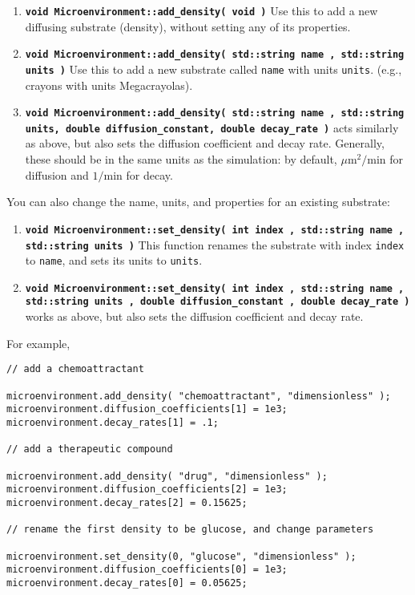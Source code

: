 \documentclass[12pt]{article}
\newcommand{\micron}{\mu\textrm{m}}
\renewcommand{\v}{\verb}
\newcommand{\smallcode}[1]{\textbf{\texttt{#1}}}
\begin{document}
\begin{enumerate}
\item 
\smallcode{void Microenvironment::add\_density( void )} Use this to add a new diffusing 
substrate (density), without setting any of its properties. 

\item 
\smallcode{void Microenvironment::add\_density( std::string name , std::string units )} Use this 
to add a new substrate called \v|name| with units \v|units|. (e.g., crayons with units Megacrayolas). 

\item 
\smallcode{void Microenvironment::add\_density( std::string name , std::string units, double diffusion\_constant, double decay\_rate )} acts similarly as above, but also sets the diffusion coefficient and decay rate. Generally, 
these should be in the same units as the simulation: by default, $\micron^2/\textrm{min}$ for diffusion 
and $1/\textrm{min}$ for decay. 
\end{enumerate}

You can also change the name, units, and properties for an existing substrate: 
\begin{enumerate}
\item 
\smallcode{void Microenvironment::set\_density( int index , std::string name , std::string units )} This 
function renames the substrate with index \v|index| to \v|name|, and sets its units to \v|units|. 

\item 
\smallcode{void Microenvironment::set\_density( int index , std::string name , std::string units , 
double diffusion\_constant , double decay\_rate )} works as above, but 
also sets the diffusion coefficient and decay rate. 
\end{enumerate}

For example, 
\begin{verbatim}
// add a chemoattractant 

microenvironment.add_density( "chemoattractant", "dimensionless" ); 
microenvironment.diffusion_coefficients[1] = 1e3; 
microenvironment.decay_rates[1] = .1; 	
	
// add a therapeutic compound
	
microenvironment.add_density( "drug", "dimensionless" ); 
microenvironment.diffusion_coefficients[2] = 1e3; 
microenvironment.decay_rates[2] = 0.15625; 	
	
// rename the first density to be glucose, and change parameters 
	
microenvironment.set_density(0, "glucose", "dimensionless" ); 
microenvironment.diffusion_coefficients[0] = 1e3; 
microenvironment.decay_rates[0] = 0.05625; 	
\end{verbatim}
\end{document}
